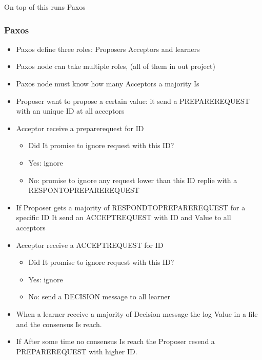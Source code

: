 \documentclass{beamer}
\begin{document}
\begin{frame}
  \begin{center}
    \huge On top of this runs Paxos
  \end{center}
\end{frame}

\begin{frame}
  \frametitle{Paxos}
  \begin{itemize}
  \item Paxos define three roles: Proposers Acceptors and learners
  \item Paxos node can take multiple roles, (all of them in out project)
  \item Paxos node must know how many Acceptors a majority Is
  \end{itemize}
\end{frame}

\begin{frame}
  \begin{itemize}
  \item Proposer want to propose a certain value: it send a PREPAREREQUEST with an unique ID at all acceptors
  \item Acceptor receive a preparerequest for ID
  \begin{itemize}
  \item Did It promise to ignore request with this ID?
  \item Yes: ignore
  \item No: promise to ignore any request lower than this ID replie with a RESPONTOPREPAREREQUEST
  \end{itemize}
  \end{itemize}
\end{frame}


\begin{frame}
  \begin{itemize}
  \item If Proposer gets a majority of RESPONDTOPREPAREREQUEST for a specific ID It send an ACCEPTREQUEST with ID and Value to all acceptors
  \item Acceptor receive a ACCEPTREQUEST for ID
  \begin{itemize}
  \item Did It promise to ignore request with this ID?
  \item Yes: ignore
  \item No: send a DECISION message to all learner
  \end{itemize}
  \item When a learner receive a majority of Decision message the log Value in a file and the consensus Is reach.
  \item If After some time no consensus Is reach the Proposer resend a PREPAREREQUEST with higher ID.
  \end{itemize}
\end{frame}
\end{document}
